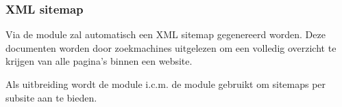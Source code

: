 \subsubsection{XML sitemap}
Via de  module zal automatisch een XML sitemap gegenereerd worden. Deze documenten worden door zoekmachines uitgelezen om een volledig overzicht te krijgen van alle pagina's binnen een website.

Als uitbreiding wordt de  module i.c.m. de  module gebruikt om sitemaps per subsite aan te bieden.